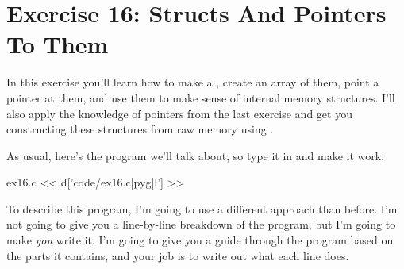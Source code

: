 \chapter{Exercise 16: Structs And Pointers To Them}

In this exercise you'll learn how to make a ,
create an array of them, point a pointer at them, and use them
to make sense of internal memory structures.  I'll also apply
the knowledge of pointers from the last exercise and get you
constructing these structures from raw memory using .

As usual, here's the program we'll talk about, so type it in and
make it work:

\begin{code}{ex16.c}
<< d['code/ex16.c|pyg|l'] >>
\end{code}

To describe this program, I'm going to use a different approach
than before.  I'm not going to give you a line-by-line breakdown
of the program, but I'm going to make \emph{you} write it.  I'm
going to give you a guide through the program based on the
parts it contains, and your job is to write out what each line does.

